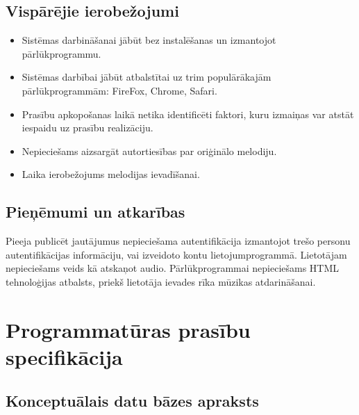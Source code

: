 \documentclass[12pt]{article}
\begin{document}
\subsection{Vispārējie ierobežojumi}

\begin{itemize}
\setlength{\itemsep}{0em}
\item Sistēmas darbināšanai jābūt bez instalēšanas un izmantojot pārlūkprogrammu.
\item Sistēmas darbībai jābūt atbalstītai uz trim populārākajām pārlūkprogrammām: FireFox, Chrome, Safari.
\item Prasību apkopošanas laikā netika identificēti faktori, kuru izmaiņas var atstāt iespaidu uz prasību realizāciju.
\item Nepieciešams aizsargāt autortiesības par oriģinālo melodiju.
\item Laika ierobežojums melodijas ievadīšanai.
\end{itemize}

\subsection{Pieņēmumi un atkarības}

Pieeja publicēt jautājumus nepieciešama autentifikācija izmantojot trešo personu autentifikācijas informāciju, vai izveidoto kontu lietojumprogrammā. Lietotājam nepieciešams veids kā atskaņot audio. Pārlūkprogrammai nepieciešams HTML tehnoloģijas atbalsts, priekš lietotāja ievades rīka mūzikas atdarināšanai.

\pagebreak

\section{Programmatūras prasību specifikācija}

\subsection{Konceptuālais datu bāzes apraksts}
\end{document}
